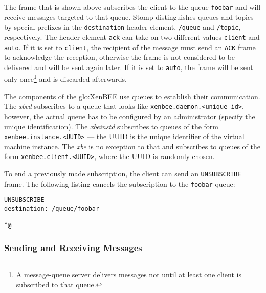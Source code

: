 The  frame  that  is  shown  above  subscribes the  client  to  the  queue
\texttt{foobar} and  will receive messages  targeted to that  queue. Stomp
distinguishes   queues   and   topics   by   special   prefixes   in   the
\texttt{destination}    header    element,    \ie   \texttt{/queue}    and
\texttt{/topic}, respectively. The header element \texttt{ack} can take on
two different  values \texttt{client} and  \texttt{auto}. If it is  set to
\texttt{client}, the  recipient of the  message must send  an \texttt{ACK}
frame to acknowledge the reception,  otherwise the frame is not considered
to  be  delivered  and  will  be  sent  again later.   If  it  is  set  to
\texttt{auto}, the  frame will be sent  only once\footnote{A message-queue
  server delivers messages not until  at least one client is subscribed to
  that queue.}  and is discarded afterwards.

The  components of  the  \gls{glo:XenBEE} use  queues  to establish  their
communication.   The \emph{xbed}  subscribes to  a queue  that  looks like
\texttt{xenbee.daemon.<unique-id>},  however, the actual  queue has  to be
configured by  an administrator  (\ie specify the  unique identification).
The    \emph{xbeinstd}    subscribes     to    queues    of    the    form
\texttt{xenbee.instance.<UUID>} ---  the UUID is the  unique identifier of
the virtual machine  instance. The \emph{xbe} is no  exception to that and
subscribes to queues of  the form \texttt{xenbee.client.<UUID>}, where the
UUID is randomly chosen.

To  end   a  previously  made   subscription,  the  client  can   send  an
\texttt{UNSUBSCRIBE} frame. The following listing cancels the subscription
to the \texttt{foobar} queue:

\medskip
\begin{center}
  \begin{minipage}{.75\textwidth}
    \begin{lstlisting}[captionpos=b,backgroundcolor=\color{listingcolor},frame=lines,numbers=none,stepnumber=5,numberfirstline=false,numberstyle=\tiny,caption={The
        \texttt{UNSUBSCRIBE} frame revokes a previously made subscription.},label={lst:stomp-unsubscribe}]
UNSUBSCRIBE
destination: /queue/foobar

^@
    \end{lstlisting}
  \end{minipage}
\end{center}


\subsubsection{Sending and Receiving Messages}

